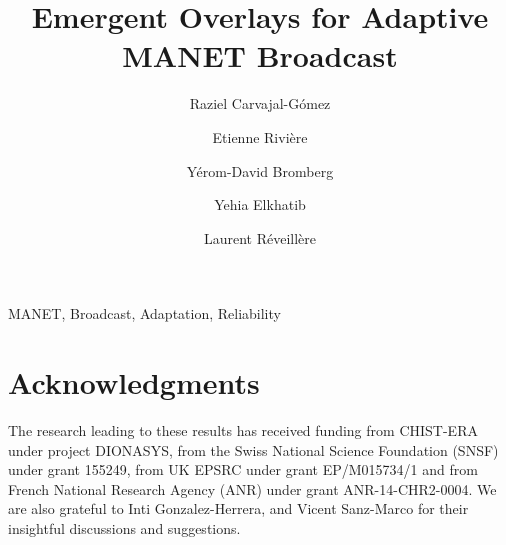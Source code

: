 \documentclass[1p]{elsarticle}
\begin{document}
\title{Emergent Overlays for Adaptive MANET Broadcast}

\author[1]{Raziel Carvajal-Gómez}

\author[1]{Etienne Rivière}

\address[1]{ICTEAM, UCLouvain, Belgium}

\author[2]{Yérom-David Bromberg}
\address[2]{Univ Rennes, Inria, CNRS, IRISA, France}
%
\author[3]{Yehia Elkhatib}
\address[3]{School of Computing and Communications, Lancaster University, United Kingdom}
%
\author[4]{Laurent Réveillère}
\address[4]{Univ. Bordeaux, CNRS, Bordeaux INP, LaBRI, UMR 5800, France}
%

\begin{frontmatter}



\begin{keyword}
MANET, Broadcast, Adaptation, Reliability
\end{keyword}

\end{frontmatter}










\section*{Acknowledgments}

The research leading to these results has received funding from CHIST-ERA under project DIONASYS, from the Swiss National Science Foundation (SNSF) under grant 155249, from UK EPSRC under grant EP/M015734/1 and from French National Research Agency (ANR) under grant ANR-14-CHR2-0004.
We are also grateful to Inti Gonzalez-Herrera, and Vicent Sanz-Marco for their insightful discussions and suggestions.




\appendix

\end{document}

